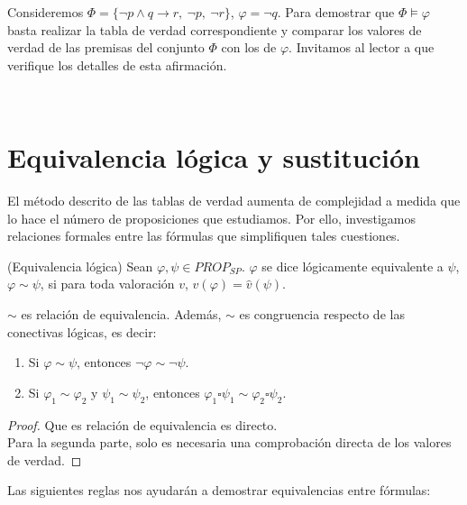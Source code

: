 \begin{example} Consideremos $\Phi = \{\neg p \land q \rightarrow r, \ \neg p, \ \neg r \}$, $\varphi = \neg q$. Para demostrar que $\Phi \vDash \varphi$ basta realizar la tabla de verdad correspondiente y comparar los valores de verdad de las premisas del conjunto $\Phi$ con los de $\varphi$. Invitamos al lector a que verifique los detalles de esta afirmación.
\end{example} \\

\section{Equivalencia lógica y sustitución}

El método descrito de las tablas de verdad aumenta de complejidad a medida que lo hace el número de proposiciones que estudiamos. Por ello, investigamos relaciones formales entre las fórmulas que simplifiquen tales cuestiones. 

\begin{definition}(Equivalencia lógica) Sean $\varphi, \psi \in PROP_{SP}$. $\varphi$ se dice lógicamente equivalente a $\psi$, $\varphi \sim \psi$, si para toda valoración $v$, $\hat{v}(\varphi) = \hat{v}(\psi)$.
\end{definition}

\begin{prop} $\sim$ es relación de equivalencia. Además, $\sim$ es congruencia respecto de las conectivas lógicas, es decir:
\begin{enumerate}
    \item Si $\varphi \sim \psi$, entonces $\neg \varphi \sim \neg \psi$.
    \item Si $\varphi_1 \sim \varphi_2$ y $\psi_1 \sim \psi_2$, entonces $\varphi_1 \square \psi_1 \sim \varphi_2 \square \psi_2 $.
\end{enumerate}
\end{prop}
\begin{proof}
Que es relación de equivalencia es directo. \\
Para la segunda parte, solo es necesaria una comprobación directa de los valores de verdad.
\end{proof}

Las siguientes reglas nos ayudarán a demostrar equivalencias entre fórmulas:


